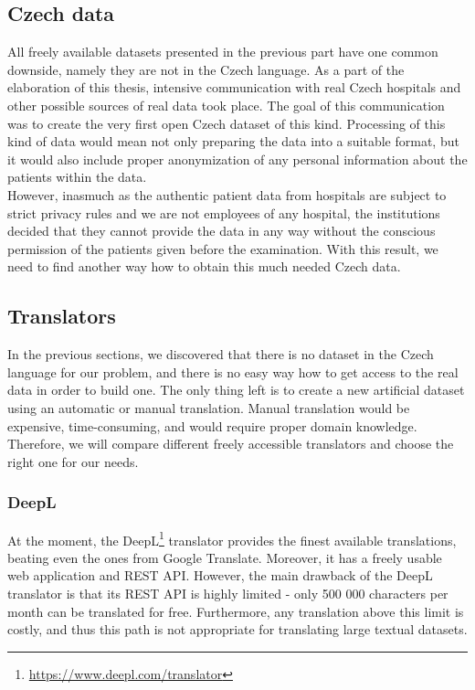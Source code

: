 \subsection{Czech data}
\label{sec:CzechData}
All freely available datasets presented in the previous part have one common downside, namely they are not in the Czech language. As a part of the elaboration of this thesis, intensive communication with real Czech hospitals and other possible sources of real data took place. The goal of this communication was to create the very first open Czech dataset of this kind. Processing of this kind of data would mean not only preparing the data into a suitable format, but it would also include proper anonymization of any personal information about the patients within the data. \\

However, inasmuch as the authentic patient data from hospitals are subject to strict privacy rules and we are not employees of any hospital, the institutions decided that they cannot provide the data in any way without the conscious permission of the patients given before the examination. With this result, we need to find another way how to obtain this much needed Czech data.

\subsection{Translators}
\label{sec:Translators}
In the previous sections, we discovered that there is no dataset in the Czech language for our problem, and there is no easy way how to get access to the real data in order to build one. The only thing left is to create a new artificial dataset using an automatic or manual translation. Manual translation would be expensive, time-consuming, and would require proper domain knowledge. Therefore, we will compare different freely accessible translators and choose the right one for our needs.

\subsubsection{DeepL}
At the moment, the DeepL\footnote[11]{\url{https://www.deepl.com/translator}} translator provides the finest available translations, beating even the ones from Google Translate. Moreover, it has a freely usable web application and REST API. However, the main drawback of the DeepL translator is that its REST API is highly limited - only 500 000 characters per month can be translated for free. Furthermore, any translation above this limit is costly, and thus this path is not appropriate for translating large textual datasets.

